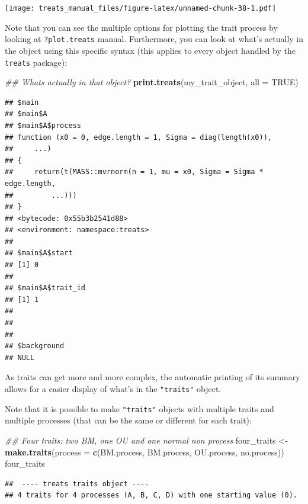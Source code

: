 \documentclass[
]{book}
\newenvironment{Shaded}{\begin{snugshade}}{\end{snugshade}}
\newcommand{\CommentTok}[1]{\textcolor[rgb]{0.56,0.35,0.01}{\textit{#1}}}
\newcommand{\DataTypeTok}[1]{\textcolor[rgb]{0.13,0.29,0.53}{#1}}
\newcommand{\KeywordTok}[1]{\textcolor[rgb]{0.13,0.29,0.53}{\textbf{#1}}}
\newcommand{\NormalTok}[1]{#1}
\newcommand{\OtherTok}[1]{\textcolor[rgb]{0.56,0.35,0.01}{#1}}
\newcommand{\StringTok}[1]{\textcolor[rgb]{0.31,0.60,0.02}{#1}}
\begin{document}
\texttt{[image: treats\_manual\_files/figure-latex/unnamed-chunk-38-1.pdf]}

Note that you can see the multiple options for plotting the trait process by looking at \texttt{?plot.treats} manual. Furthermore, you can look at what's actually in the object using this specific syntax (this applies to every object handled by the \texttt{treats} package):

\begin{Shaded}
\begin{Highlighting}[]
\CommentTok{\#\# What\textquotesingle{}s actually in that object?}
\KeywordTok{print.treats}\NormalTok{(my\_trait\_object, }\DataTypeTok{all =} \OtherTok{TRUE}\NormalTok{)}
\end{Highlighting}
\end{Shaded}

\begin{verbatim}
## $main
## $main$A
## $main$A$process
## function (x0 = 0, edge.length = 1, Sigma = diag(length(x0)), 
##     ...) 
## {
##     return(t(MASS::mvrnorm(n = 1, mu = x0, Sigma = Sigma * edge.length, 
##         ...)))
## }
## <bytecode: 0x55b3b2541d88>
## <environment: namespace:treats>
## 
## $main$A$start
## [1] 0
## 
## $main$A$trait_id
## [1] 1
## 
## 
## 
## $background
## NULL
\end{verbatim}

As traits can get more and more complex, the automatic printing of its summary allows for a easier display of what's in the \texttt{"traits"} object.

Note that it is possible to make \texttt{"traits"} objects with multiple traits and multiple processes (that can be the same or different for each trait):

\begin{Shaded}
\begin{Highlighting}[]
\CommentTok{\#\# Four traits: two BM, one OU and one normal non process}
\NormalTok{four\_traits \textless{}{-}}\StringTok{ }\KeywordTok{make.traits}\NormalTok{(}\DataTypeTok{process =} \KeywordTok{c}\NormalTok{(BM.process,}
\NormalTok{                                       BM.process,}
\NormalTok{                                       OU.process,}
\NormalTok{                                       no.process))}
\NormalTok{four\_traits}
\end{Highlighting}
\end{Shaded}

\begin{verbatim}
##  ---- treats traits object ---- 
## 4 traits for 4 processes (A, B, C, D) with one starting value (0).
\end{verbatim}
\end{document}
